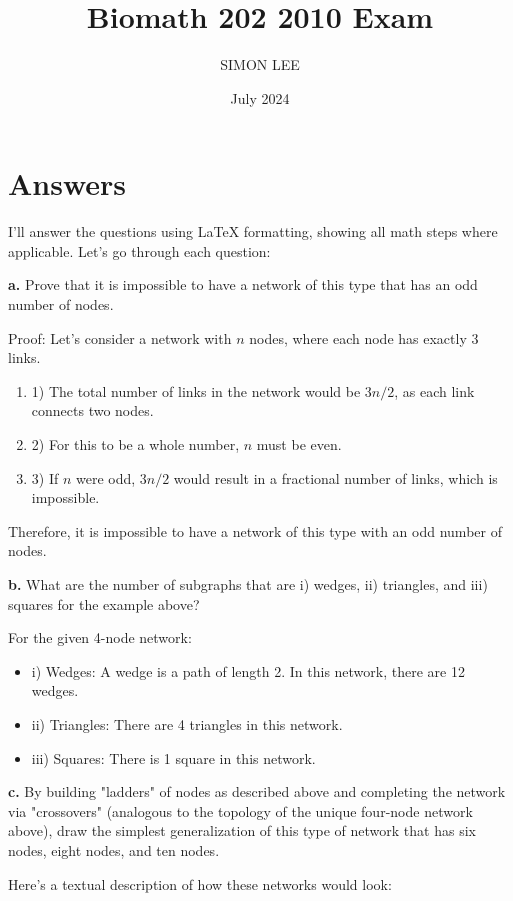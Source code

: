 \documentclass{article}
\title{Biomath 202 2010 Exam}
\author{SIMON LEE}
\date{July 2024}
\begin{document}
\maketitle

\section{Answers}

I'll answer the questions using LaTeX formatting, showing all math steps where applicable. Let's go through each question:

\textbf{a.} Prove that it is impossible to have a network of this type that has an odd number of nodes.

Proof:
Let's consider a network with $n$ nodes, where each node has exactly 3 links.

\begin{enumerate}
    \item 1) The total number of links in the network would be $3n/2$, as each link connects two nodes.
    \item 2) For this to be a whole number, $n$ must be even.
    \item 3) If $n$ were odd, $3n/2$ would result in a fractional number of links, which is impossible.
\end{enumerate}

Therefore, it is impossible to have a network of this type with an odd number of nodes.

\textbf{b.} What are the number of subgraphs that are i) wedges, ii) triangles, and iii) squares for the example above?

For the given 4-node network:

\begin{itemize}
    \item i) Wedges: A wedge is a path of length 2. In this network, there are 12 wedges.
    \item ii) Triangles: There are 4 triangles in this network.
    \item iii) Squares: There is 1 square in this network.
\end{itemize}

\textbf{c.} By building "ladders" of nodes as described above and completing the network via "crossovers" (analogous to the topology of the unique four-node network above), draw the simplest generalization of this type of network that has six nodes, eight nodes, and ten nodes.

Here's a textual description of how these networks would look:
\end{document}
